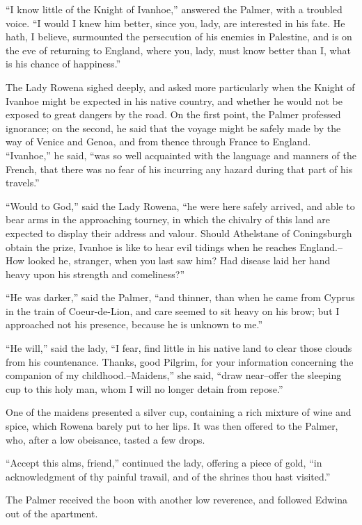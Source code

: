 ``I know little of the Knight of Ivanhoe,'' answered the Palmer, with a
troubled voice. ``I would I knew him better, since you, lady, are
interested in his fate. He hath, I believe, surmounted the persecution
of his enemies in Palestine, and is on the eve of returning to England,
where you, lady, must know better than I, what is his chance of
happiness.''

The Lady Rowena sighed deeply, and asked more particularly when the
Knight of Ivanhoe might be expected in his native country, and whether
he would not be exposed to great dangers by the road. On the first
point, the Palmer professed ignorance; on the second, he said that the
voyage might be safely made by the way of Venice and Genoa, and from
thence through France to England. ``Ivanhoe,'' he said, ``was so well
acquainted with the language and manners of the French, that there was
no fear of his incurring any hazard during that part of his travels.''

``Would to God,'' said the Lady Rowena, ``he were here safely arrived,
and able to bear arms in the approaching tourney, in which the chivalry
of this land are expected to display their address and valour. Should
Athelstane of Coningsburgh obtain the prize, Ivanhoe is like to hear
evil tidings when he reaches England.--How looked he, stranger, when you
last saw him? Had disease laid her hand heavy upon his strength and
comeliness?''

``He was darker,'' said the Palmer, ``and thinner, than when he came
from Cyprus in the train of Coeur-de-Lion, and care seemed to sit heavy
on his brow; but I approached not his presence, because he is unknown to
me.''

``He will,'' said the lady, ``I fear, find little in his native land to
clear those clouds from his countenance. Thanks, good Pilgrim, for your
information concerning the companion of my childhood.--Maidens,'' she
said, ``draw near--offer the sleeping cup to this holy man, whom I will
no longer detain from repose.''

One of the maidens presented a silver cup, containing a rich mixture of
wine and spice, which Rowena barely put to her lips. It was then offered
to the Palmer, who, after a low obeisance, tasted a few drops.

``Accept this alms, friend,'' continued the lady, offering a piece of
gold, ``in acknowledgment of thy painful travail, and of the shrines
thou hast visited.''

The Palmer received the boon with another low reverence, and followed
Edwina out of the apartment.

